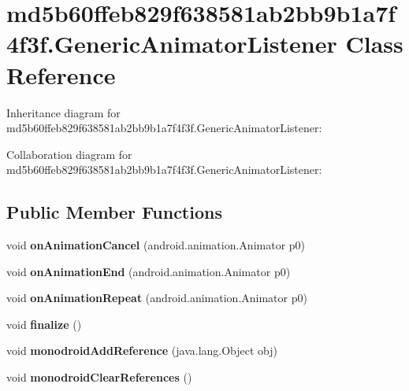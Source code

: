 \hypertarget{classmd5b60ffeb829f638581ab2bb9b1a7f4f3f_1_1_generic_animator_listener}{}\section{md5b60ffeb829f638581ab2bb9b1a7f4f3f.\+Generic\+Animator\+Listener Class Reference}
\label{classmd5b60ffeb829f638581ab2bb9b1a7f4f3f_1_1_generic_animator_listener}


Inheritance diagram for md5b60ffeb829f638581ab2bb9b1a7f4f3f.\+Generic\+Animator\+Listener\+:


Collaboration diagram for md5b60ffeb829f638581ab2bb9b1a7f4f3f.\+Generic\+Animator\+Listener\+:
\subsection*{Public Member Functions}
\begin{DoxyCompactItemize}
\item 
\mbox{\label{classmd5b60ffeb829f638581ab2bb9b1a7f4f3f_1_1_generic_animator_listener_ab745db9d1bbb0cb04441a727772e9cf0}} 
void {\bfseries on\+Animation\+Cancel} (android.\+animation.\+Animator p0)
\item 
\mbox{\label{classmd5b60ffeb829f638581ab2bb9b1a7f4f3f_1_1_generic_animator_listener_ace339af29a5453d7f7cc1f5dcefd6248}} 
void {\bfseries on\+Animation\+End} (android.\+animation.\+Animator p0)
\item 
\mbox{\label{classmd5b60ffeb829f638581ab2bb9b1a7f4f3f_1_1_generic_animator_listener_ae1933b559083185b38a40651ea936d48}} 
void {\bfseries on\+Animation\+Repeat} (android.\+animation.\+Animator p0)
\item 
\mbox{\label{classmd5b60ffeb829f638581ab2bb9b1a7f4f3f_1_1_generic_animator_listener_a5498cbcf56e1098c0a13447afde9ae4a}} 
void {\bfseries finalize} ()
\item 
\mbox{\label{classmd5b60ffeb829f638581ab2bb9b1a7f4f3f_1_1_generic_animator_listener_a613f7bd903d31fdcf64c5b8fff2e0ad4}} 
void {\bfseries monodroid\+Add\+Reference} (java.\+lang.\+Object obj)
\item 
\mbox{\label{classmd5b60ffeb829f638581ab2bb9b1a7f4f3f_1_1_generic_animator_listener_a876788d7a8833b3f98d2609c2b63e16d}} 
void {\bfseries monodroid\+Clear\+References} ()
\end{DoxyCompactItemize}
